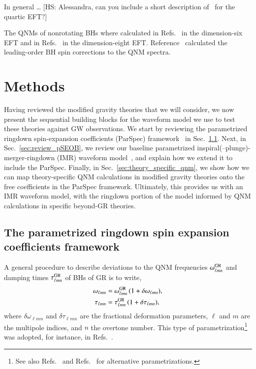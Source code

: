 \documentclass[twocolumn,
               prd,
               aps,
               superscriptaddress,
               tightenlines,
               nofootinbib,
               eqsecnum,
               amsfonts,
               amsmath,
               longbibliography]{revtex4-1}
\newcommand{\hs}[1]{{\textcolor{TealBlue}{{#1}}}}
\newcommand{\hscomm}[1]{{\textcolor{TealBlue}{{[HS: #1]}}}}
\begin{document}
In general \dots
%
\hscomm{Alessandra, can you include a short description of~\cite{Sennett:2019bpc} for the quartic EFT?}

The QNMs of nonrotating BHs where calculated in Refs.~\cite{deRham:2020ejn,Cano:2020cao} in the dimension-six EFT
and in Refs.~\cite{Cardoso:2018ptl,Cano:2020cao} in the dimension-eight EFT.
%
Reference~\cite{Cano:2020cao} calculated the leading-order BH spin corrections to the QNM spectra.

\section{Methods}
\label{sec:method}

Having reviewed the modified gravity theories that we will consider, we now present
the sequential building blocks for the waveform model we use to test these theories
against GW observations.
%
We start by reviewing the parametrized ringdown spin-expansion coefficients
(ParSpec) framework~\cite{Maselli:2019mjd} in Sec.~\ref{sec:review_parspec}.
%
Next, in Sec.~\ref{sec:review_pSEOB}, we review our baseline
parametrized inspiral(--plunge)-merger-ringdown (IMR) waveform
model~\cite{Brito:2018rfr,Ghosh:2021mrv}, and explain how we extend
it to include the ParSpec.
%
Finally, in Sec.~\ref{sec:theory_specific_qnm}, we show how we can map
theory-specific QNM calculations in modified gravity theories onto the
free coefficients in the ParSpec framework.
%
Ultimately, this provides us with an IMR waveform model, with the ringdown
portion of the model informed by QNM calculations in specific beyond-GR
theories.

\subsection{The parametrized ringdown spin expansion coefficients framework}
\label{sec:review_parspec}

A general procedure to describe deviations to the QNM frequencies $\omega^{\rm GR}_{\ell m n}$ and
damping times $\tau^{\rm GR}_{\ell m n}$ of BHs of GR is to write,
%
\begin{subequations}
\label{eq:general_deviation}
\begin{align}
\omega_{\ell m n} &= \omega_{\ell m n}^{\rm GR} \, (1 + \delta \omega_{\ell m n}), \\
\tau_{\ell m n }   &= \tau_{\ell m  n}^{\rm GR}   \, (1 + \delta \tau_{\ell m n }),
\end{align}
\end{subequations}
%
where $\delta\omega_{\ell m n}$ and $\delta\tau_{\ell m  n}$ are the fractional deformation parameters,
$\ell$ and $m$ are the multipole indices, and $n$ the overtone number.
%
This type of parametrization\footnote{\hs{See also
Refs.~\cite{Glampedakis:2017dvb,Glampedakis:2019dqh,Silva:2019scu} and
Refs.~\cite{Cardoso:2019mqo,McManus:2019ulj,Kimura:2020mrh} for alternative parametrizations.}}
was adopted, for instance, in Refs.~\cite{Gossan:2011ha,Meidam:2014jpa,Brito:2018rfr,Carullo:2018sfu,Ghosh:2021mrv}.
\end{document}
